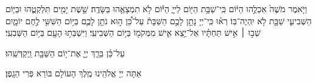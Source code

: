 \fullkaddish

\aleinu

\begin{footnotesize}
	וַיֹּ֤אמֶר מֹשֶׁה֙ אִכְלֻ֣הוּ הַיּ֔וֹם כִּֽי־שַׁבָּ֥ת הַיּ֖וֹם לַייָ֑ הַיּ֕וֹם לֹ֥א תִמְצָאֻ֖הוּ בַּשָּׂדֶֽה׃ שֵׁ֥שֶׁת יָמִ֖ים תִּלְקְטֻ֑הוּ וּבַיּ֧וֹם הַשְּׁבִיעִ֛י שַׁבָּ֖ת לֹ֥א יִֽהְיֶה־בּֽוֹ׃ רְא֗וּ כִּֽי־יְיָ נָתַ֣ן לָכֶ֣ם הַשַּׁבָּת֒ עַל־כֵּ֠ן ה֣וּא נֹתֵ֥ן לָכֶ֛ם בַּיּ֥וֹם הַשִּׁשִּׁ֖י לֶ֣חֶם יוֹמָ֑יִם שְׁב֣וּ ׀ אִ֣ישׁ תַּחְתָּ֗יו אַל־יֵ֥צֵא אִ֛ישׁ מִמְּקֹמ֖וֹ בַּיּ֥וֹם הַשְּׁבִיעִֽי׃ וַיִּשְׁבְּת֥וּ הָעָ֖ם בַּיּ֥וֹם הַשְּׁבִעִֽי׃
\end{footnotesize}


עַל־כֵּ֗ן בֵּרַ֧ךְ יְיָ֛ אֶת־י֥וֹם הַשַּׁבָּ֖ת וַֽיְקַדְּשֵֽׁהוּ׃

\savri
{}
אַתָּה יְיָ אֱלֹהֵֽינוּ מֶֽלֶךְ הָעוֹלָם בּוֹרֵא פְּרִי הַגָֽפֶן׃\\

\quad{}\quad{}\\